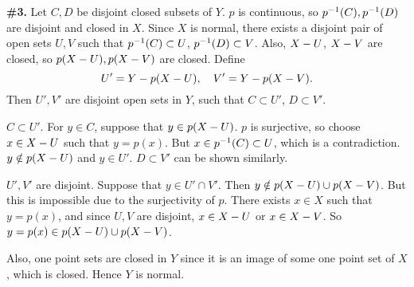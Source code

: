 \documentclass[a4paper,11pt]{article}
\begin{document}
\begin{minipage}[t][270mm]{90mm}
    {\bfseries \large \#3.} Let \(C, D\) be disjoint closed subsets of \(Y\). \(p\) is continuous, so \(p^{-1}(C), p^{-1}(D)\) are disjoint and closed in \(X\). Since \(X\) is normal, there exists a disjoint pair of open sets \(U, V\) such that \(p^{-1}(C) \subset U\), \(p^{-1}(D) \subset V\). Also, \(X - U\), \(X - V\) are closed, so \(p(X- U), p(X- V)\) are closed. Define
    \[
        U' = Y - p(X - U), \quad V' = Y - p(X - V).
    \]
    Then \(U', V'\) are disjoint open sets in \(Y\), such that \(C \subset U'\), \(D \subset V'\).

    \(C \subset U'\). For \(y \in C\), suppose that \(y \in p(X - U)\). \(p\) is surjective, so choose \(x \in X - U\) such that \(y = p(x)\). But \(x \in p^{-1}(C) \subset U\), which is a contradiction. \(y \notin p(X - U)\) and \(y \in U'\). \(D \subset V'\) can be shown similarly.

    \(U', V'\) are disjoint. Suppose that \(y \in U' \cap V'\). Then \(y \notin p(X- U) \cup p(X - V)\). But this is impossible due to the surjectivity of \(p\). There exists \(x \in X\) such that \(y = p(x)\), and since \(U, V\) are disjoint, \(x \in X - U\) or \(x \in X - V\). So \(y = p(x) \in p(X - U) \cup p(X- V)\).

    Also, one point sets are closed in \(Y\) since it is an image of some one point set of \(X\), which is closed. Hence \(Y\) is normal.
\end{minipage}
{\color{gray}\vline}
\begin{minipage}[t][270mm]{90mm}
    \phantom{?}
\end{minipage}

\newpage

\phantom{?}
\vspace{5mm}
\end{document}
